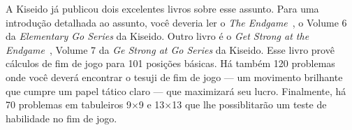 A Kiseido já publicou dois excelentes livros sobre esse assunto. Para uma introdução detalhada ao assunto, você deveria ler o \emph{The Endgame}~\cite{tomoko_bozulich_endgame}, o Volume 6 da \emph{Elementary Go Series} da Kiseido. Outro livro é o \emph{Get Strong at the Endgame}~\cite{bozulich_endgame}, Volume 7 da \emph{Ge Strong at Go Series} da Kiseido. Esse livro provê cálculos de fim de jogo para 101 posições básicas. Há também 120 problemas onde você deverá encontrar o tesuji de fim de jogo --- um movimento brilhante que cumpre um papel tático claro --- que maximizará seu lucro. Finalmente, há 70 problemas em tabuleiros 9\(\times\)9 e 13\(\times\)13 que lhe possiblitarão um teste de habilidade no fim de jogo.